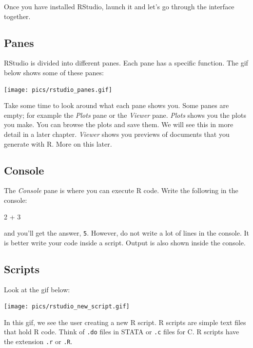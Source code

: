 \documentclass[
]{article}
\newenvironment{Shaded}{\begin{snugshade}}{\end{snugshade}}
\newcommand{\DecValTok}[1]{\textcolor[rgb]{0.00,0.00,0.81}{#1}}
\newcommand{\SpecialCharTok}[1]{\textcolor[rgb]{0.00,0.00,0.00}{#1}}
\begin{document}
Once you have installed RStudio, launch it and let's go through the interface together.

\hypertarget{panes}{%
\subsection{Panes}\label{panes}}

RStudio is divided into different panes. Each pane has a specific function. The gif below shows
some of these panes:

\texttt{[image: pics/rstudio\_panes.gif]}

Take some time to look around what each pane shows you. Some panes are empty; for example the \emph{Plots}
pane or the \emph{Viewer} pane. \emph{Plots} shows you the plots you make. You can browse the plots and save
them. We will see this in more detail in a later chapter. \emph{Viewer} shows you previews of documents
that you generate with R. More on this later.

\hypertarget{console}{%
\subsection{Console}\label{console}}

The \emph{Console} pane is where you can execute R code. Write the following in the console:

\begin{Shaded}
\begin{Highlighting}[]
\DecValTok{2} \SpecialCharTok{+} \DecValTok{3}
\end{Highlighting}
\end{Shaded}

and you'll get the answer, \texttt{5}. However, do not write a lot of lines in the console. It is better
write your code inside a script. Output is also shown inside the console.

\hypertarget{scripts}{%
\subsection{Scripts}\label{scripts}}

Look at the gif below:

\texttt{[image: pics/rstudio\_new\_script.gif]}

In this gif, we see the user creating a new R script. R scripts are simple text files that hold R
code. Think of \texttt{.do} files in STATA or \texttt{.c} files for C. R scripts have the extension \texttt{.r} or \texttt{.R}.
\end{document}
